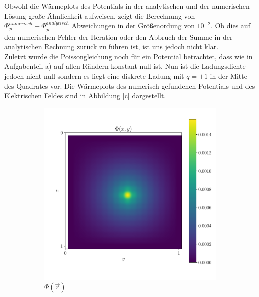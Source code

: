 Obwohl die Wärmeplots des Potentials in der analytischen und der numerischen Lösung große Ähnlichkeit aufweisen, zeigt die Berechnung von $\Phi_{jl}^{numerisch}-\Phi_{jl}^{analytisch}$ Abweichungen in der Größenordung von $10^{-2}$. Ob dies auf den numerischen Fehler der Iteration oder den Abbruch der Summe in der analytischen Rechnung zurück zu führen ist, ist uns jedoch nicht klar. \\
Zuletzt wurde die Poissongleichung noch für ein Potential betrachtet, dass wie in Aufgabenteil a) auf allen Rändern konstant null ist. Nun ist die Ladungsdichte jedoch nicht null sondern es liegt eine diskrete Ladung mit $q=+1$ in der Mitte des Quadrates vor. Die Wärmeplots des numerisch gefundenen Potentials und des Elektrischen Feldes sind in Abbildung \ref{c} dargestellt.
\begin{figure}[H]
    \centering
    \begin{subfigure}[b]{0.45\textwidth}
        \includegraphics[width=\textwidth]{Abbildungen/Phi_c.pdf}
           \caption{$\Phi\left(\vec{r}\right)$}
   \end{subfigure}
     \begin{subfigure}[b]{0.45\textwidth}

\end{subfigure}
\end{figure}
